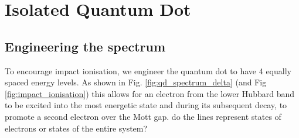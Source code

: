 \section{Isolated Quantum Dot}
\subsection{Engineering the spectrum}

To encourage impact ionisation, we engineer the quantum dot to have 4 equally spaced energy levels. As shown in Fig. \ref{fig:qd_spectrum_delta} (and Fig \ref{fig:impact_ionisation}) this allows for an electron from the lower Hubbard band to be excited into the most energetic state and during its subsequent decay, to promote a second electron over the Mott gap.
\newline
{\color{red} do the lines represent states of electrons or states of the entire system?}

